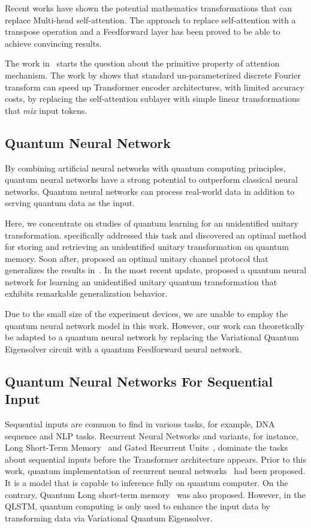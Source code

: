 Recent works have shown the potential mathematics transformations that can replace Multi-head self-attention. The approach to replace self-attention with a transpose operation and a Feedforward layer has been proved to be able to achieve convincing results.

The work in~\cite{DBLP:journals/corr/abs-2105-02723} starts the question about the primitive property of attention mechanism. The work by \cite{DBLP:journals/corr/abs-2105-03824} shows that standard un-parameterized discrete Fourier transform can speed up Transformer encoder architectures, with limited accuracy costs, by replacing the self-attention sublayer with simple linear transformations that \emph{mix} input tokens.

\subsection{Quantum Neural Network}
By combining artificial neural networks with quantum computing principles, quantum neural networks have a strong potential to outperform classical neural networks. Quantum neural networks can process real-world data in addition to serving quantum data as the input.

Here, we concentrate on studies of quantum learning for an unidentified unitary transformation. \cite{PhysRevA.81.032324} specifically addressed this task and discovered an optimal method for storing and retrieving an unidentified unitary transformation on quantum memory. Soon after, \cite{PhysRevLett.122.170502} proposed an optimal unitary channel protocol that generalizes the results in~\cite{PhysRevA.81.032324}. In the most recent update, \cite{beer2020training} proposed a quantum neural network for learning an unidentified unitary quantum transformation that exhibits remarkable generalization behavior. 

Due to the small size of the experiment devices, we are unable to employ the quantum neural network model in this work. However, our work can theoretically be adapted to a quantum neural network by replacing the Variational Quantum Eigensolver circuit with a quantum Feedforward neural network. 

\subsection{Quantum Neural Networks For Sequential Input}

Sequential inputs are common to find in various tasks, for example, DNA sequence and NLP tasks. Recurrent Neural Networks and variants, for instance, Long Short-Term Memory~\cite{hochreiter1997long} and Gated Recurrent Units~\cite{cho2014learning}, dominate the tasks about sequential inputs before the Transformer architecture appears. Prior to this work, quantum implementation of recurrent neural networks~\cite{NEURIPS2020_0ec96be3} had been proposed. It is a model that is capable to inference fully on quantum computer. On the contrary, Quantum Long short-term memory~\cite{9747369} was also proposed. However, in the QLSTM, quantum computing is only used to enhance the input data by transforming data via Variational Quantum Eigensolver.
